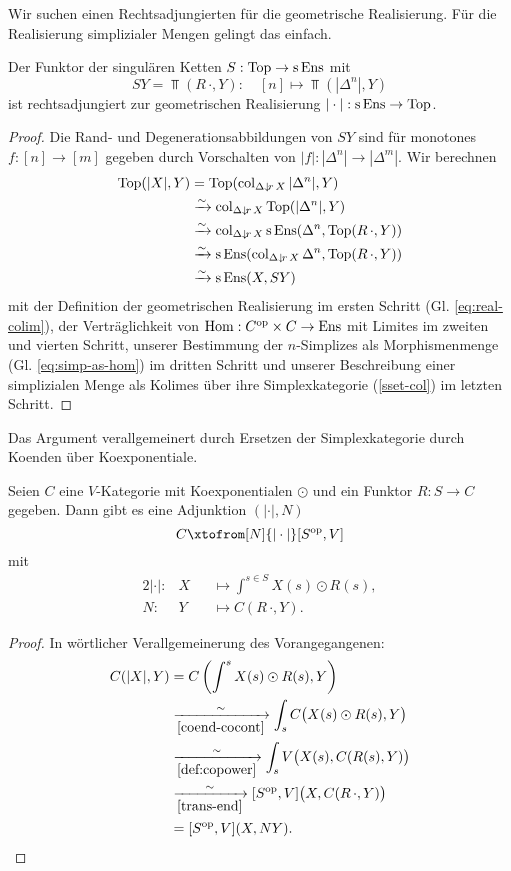 Wir suchen einen Rechtsadjungierten für die geometrische
Realisierung. Für die Realisierung simplizialer Mengen gelingt das
einfach.
\begin{satz}
  Der Funktor der singulären Ketten $S: \operatorname{Top} \to \operatorname{s}\operatorname{Ens}$ mit
  \[ SY  = \Top(R \, \cdot, Y): \quad [n] \mapsto \Top(|\Delta^n|, Y)
  \]
  ist rechtsadjungiert zur geometrischen Realisierung $|\cdot|: \operatorname{s}\operatorname{Ens}
  \to \operatorname{Top}$.
\end{satz}
\begin{proof}
  Die Rand- und Degenerationsabbildungen von $SY$ sind für monotones
  $f: [n] \to [m]$ gegeben durch Vorschalten von $|f|: |\Delta^n| \to
  |\Delta^m|$. Wir berechnen
  \begin{align*}
    \operatorname{Top}(|X|, Y)
    & = \operatorname{Top}(\operatorname{col}_{\Delta \downarrow \! {\scriptstyle r} \, X} |\Delta^n|, Y) \\
    & \xrightarrow[]{\sim} \operatorname{col}_{\Delta \downarrow \! {\scriptstyle r} \, X} \operatorname{Top}(|\Delta^n|, Y) \\
    & \xrightarrow[]{\sim} \operatorname{col}_{\Delta \downarrow \! {\scriptstyle r} \, X} \operatorname{s}\operatorname{Ens}(\Delta^n, \operatorname{Top}(R \, \cdot, Y)) \\
    & \xrightarrow[]{\sim} \operatorname{s}\operatorname{Ens}(\operatorname{col}_{\Delta \downarrow \! {\scriptstyle r} \, X} \Delta^n, \operatorname{Top}(R \, \cdot, Y)) \\
    & \xrightarrow[]{\sim} \operatorname{s}\operatorname{Ens}(X, SY)
  \end{align*}  
  mit der Definition der geometrischen Realisierung im ersten Schritt
  (Gl. \ref{eq:real-colim}), der Verträglichkeit von $\operatorname{Hom}: C^\mathrm{op}
  \times C \to \operatorname{Ens}$ mit Limites im zweiten und vierten Schritt,
  unserer Bestimmung der $n$-Simplizes als Morphismenmenge
  (Gl. \ref{eq:simp-as-hom}) im dritten Schritt und unserer
  Beschreibung einer simplizialen Menge als Kolimes über ihre
  Simplexkategorie (\ref{sset-col}) im letzten Schritt.
\end{proof}
Das Argument verallgemeinert durch Ersetzen der Simplexkategorie durch
Koenden über Koexponentiale.
\begin{theorem} 
  \label{nerve}
  Seien $C$ eine $V$-Kategorie mit Koexponentialen $\odot$ und ein
  Funktor $R: S \to C$ gegeben. Dann gibt es eine Adjunktion
  $(|\cdot|, N)$
  \[ C \xtofrom[N]{|\cdot|} [S\op, V] \]
  mit
  \begin{alignat*}{2}
    |\cdot|: & X &&\mapsto \int^{s \in S} X(s) \odot R(s) , \\
    N: & Y &&\mapsto C(R \, \cdot, Y).
  \end{alignat*}
\end{theorem}
\begin{proof}
  In wörtlicher Verallgemeinerung des Vorangegangenen:
  \begin{align*}
     C(|X|, Y)
     &= C \left( \int^s X(s) \odot R(s), Y \right) \\
     & \xrightarrow[\ref{coend-cocont}]{\sim}
       \int_s C \big( X(s) \odot R(s), Y \big) \\
     & \xrightarrow[\ref{def:copower}]{\sim}
       \int_s V \big( X(s), C(R(s), Y) \big) \\
     & \xrightarrow[\ref{trans-end}]{\sim}
       [S^\mathrm{op}, V] \big( X, C(R \, \cdot, Y) \big) \\
     &= [S^\mathrm{op}, V] (X, NY).
  \end{align*}
\end{proof}
